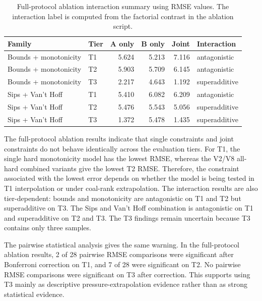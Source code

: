 \documentclass[11pt]{article}
\begin{document}
\begin{table}[htbp]
    \centering
    \begin{tabular}{@{}llrrrl@{}}
        \toprule
        \textbf{Family}       & \textbf{Tier}   & \textbf{A only}
                              & \textbf{B only} & \textbf{Joint}  & \textbf{Interaction}                         \\
        \midrule
        Bounds + monotonicity & T1              & 5.624           & 5.213                & 7.116 & antagonistic  \\
        Bounds + monotonicity & T2              & 5.903           & 5.709                & 6.145 & antagonistic  \\
        Bounds + monotonicity & T3              & 2.217           & 4.643                & 1.192 & superadditive \\
        Sips + Van't Hoff     & T1              & 5.410           & 6.082                & 6.209 & antagonistic  \\
        Sips + Van't Hoff     & T2              & 5.476           & 5.543                & 5.056 & superadditive \\
        Sips + Van't Hoff     & T3              & 1.372           & 5.478                & 1.435 & superadditive \\
        \bottomrule
    \end{tabular}
    \caption{Full-protocol ablation interaction summary using RMSE values. The
        interaction label is computed from the factorial contrast in the ablation
        script.}
    \label{tab:ablation-interactions}
\end{table}

The full-protocol ablation results indicate that single constraints and joint
constraints do not behave identically across the evaluation tiers. For T1, the
single hard monotonicity model has the lowest RMSE, whereas the V2/V8 all-hard
combined variants give the lowest T2 RMSE. Therefore, the constraint associated
with the lowest error depends on whether the model is being tested in T1
interpolation or under coal-rank extrapolation. The interaction results are
also tier-dependent:
bounds and monotonicity are antagonistic on T1 and T2 but superadditive on T3.
The Sips and Van't Hoff combination is antagonistic on T1 and superadditive on
T2 and T3. The T3 findings remain uncertain because T3 contains only three
samples.

The pairwise statistical analysis gives the same warning. In the full-protocol
ablation results, 2 of 28 pairwise RMSE comparisons were significant after
Bonferroni correction on T1, and 7 of 28 were significant on T2. No pairwise
RMSE comparisons were significant on T3 after correction. This supports using
T3 mainly as descriptive pressure-extrapolation evidence rather than as strong
statistical evidence.
\end{document}
